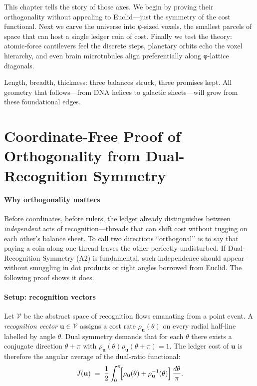\documentclass[11pt,oneside]{book}
\begin{document}
This chapter tells the story of those axes.  
We begin by proving their orthogonality without appealing to Euclid—just the symmetry of the cost functional.  
Next we carve the universe into φ-sized voxels, the smallest parcels of space that can host a single ledger coin of cost.  
Finally we test the theory: atomic‐force cantilevers feel the discrete steps, planetary orbits echo the voxel hierarchy, and even brain microtubules align preferentially along φ-lattice diagonals.  

Length, breadth, thickness: three balances struck, three promises kept.  
All geometry that follows—from DNA helices to galactic sheets—will grow from these foundational edges.

\section{Coordinate-Free Proof of Orthogonality from Dual-Recognition Symmetry}
\label{sec:orthogonality-proof}

\paragraph*{Why orthogonality matters}

Before coordinates, before rulers, the ledger already distinguishes
between \emph{independent} acts of recognition—threads that can shift
cost without tugging on each other’s balance sheet.  
To call two directions “orthogonal’’ is to say that paying a coin along
one thread leaves the other perfectly undisturbed.  
If Dual-Recognition Symmetry (A2) is fundamental, such independence
should appear without smuggling in dot products or right angles borrowed
from Euclid.  The following proof shows it does.

\paragraph*{Setup: recognition vectors}

Let \(\mathcal V\) be the abstract space of recognition flows emanating
from a point event.  A \emph{recognition vector}
\(\mathbf u \in \mathcal V\) assigns a cost rate
\(\rho_{\mathbf u}(\theta)\) on every radial half-line labelled by
angle \(\theta\).  Dual symmetry demands that for each
\(\theta\) there exists a conjugate direction \(\theta+\pi\) with
\(\rho_{\mathbf u}(\theta)\rho_{\mathbf u}(\theta+\pi)=1\).
The ledger cost of \(\mathbf u\) is therefore the angular average of the
dual-ratio functional:
\[
  J(\mathbf u)
  \;=\;
  \frac12 \int_{0}^{\pi}\!
      \Bigl[\rho_{\mathbf u}(\theta)+
            \rho_{\mathbf u}^{-1}(\theta)\Bigr]\,
      \frac{d\theta}{\pi}.
\]
\end{document}

